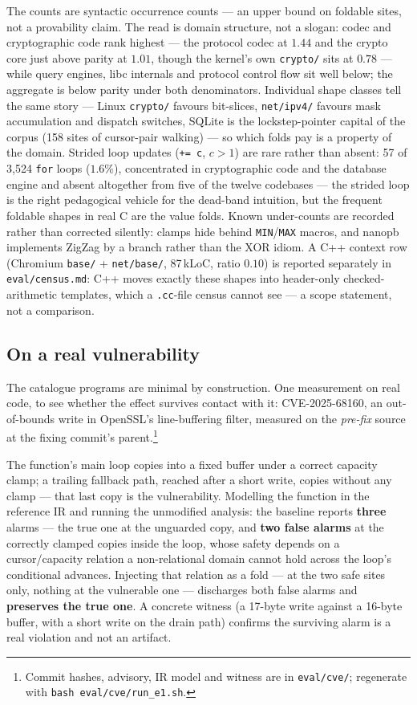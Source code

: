 \documentclass[11pt,a4paper]{article}
\begin{document}
\noindent
The counts are syntactic occurrence counts --- an upper bound on foldable sites, not a
provability claim. The read is domain structure, not a slogan: codec and cryptographic
code rank highest --- the protocol codec at $1.44$ and the crypto core just above parity
at $1.01$, though the kernel's own \texttt{crypto/} sits at $0.78$ --- while query
engines, libc internals and protocol control flow sit well below; the aggregate is below
parity under both denominators. Individual shape classes tell the same story --- Linux \texttt{crypto/}
favours bit-slices, \texttt{net/ipv4/} favours mask accumulation and dispatch switches,
SQLite is the lockstep-pointer capital of the corpus (158 sites of cursor-pair walking)
--- so which folds pay is a property of the domain. Strided loop updates
(\texttt{+= c}, $c > 1$) are rare rather than absent: 57 of 3{,}524 \texttt{for} loops
($1.6\%$), concentrated in cryptographic code and the database engine and absent
altogether from five of the twelve codebases --- the strided loop is the right
pedagogical vehicle for the dead-band intuition, but the frequent foldable shapes in real
C are the value folds.
Known under-counts are recorded rather than corrected silently: clamps hide behind
\texttt{MIN}/\texttt{MAX} macros, and nanopb implements ZigZag by a branch rather than
the XOR idiom. A C++ context row (Chromium \texttt{base/} + \texttt{net/base/},
87\,kLoC, ratio $0.10$) is reported separately in \texttt{eval/census.md}: C++ moves
exactly these shapes into header-only checked-arithmetic templates, which a
\texttt{.cc}-file census cannot see --- a scope statement, not a comparison.

\subsection{On a real vulnerability}
\label{sec:cve}

The catalogue programs are minimal by construction. One measurement on real code, to see
whether the effect survives contact with it: CVE-2025-68160, an out-of-bounds write in
OpenSSL's line-buffering filter, measured on the \emph{pre-fix} source at the fixing
commit's parent.\footnote{Commit hashes, advisory, IR model and witness are in
\texttt{eval/cve/}; regenerate with \texttt{bash eval/cve/run\_e1.sh}.}

The function's main loop copies into a fixed buffer under a correct capacity clamp; a
trailing fallback path, reached after a short write, copies without any clamp --- that
last copy is the vulnerability. Modelling the function in the reference IR and running
the unmodified analysis: the baseline reports \textbf{three} alarms --- the true one at
the unguarded copy, and \textbf{two false alarms} at the correctly clamped copies inside
the loop, whose safety depends on a cursor/capacity relation a non-relational domain
cannot hold across the loop's conditional advances. Injecting that relation as a fold ---
at the two safe sites only, nothing at the vulnerable one --- discharges both false alarms
and \textbf{preserves the true one}. A concrete witness (a 17-byte write against a
16-byte buffer, with a short write on the drain path) confirms the surviving alarm is a
real violation and not an artifact.
\end{document}

